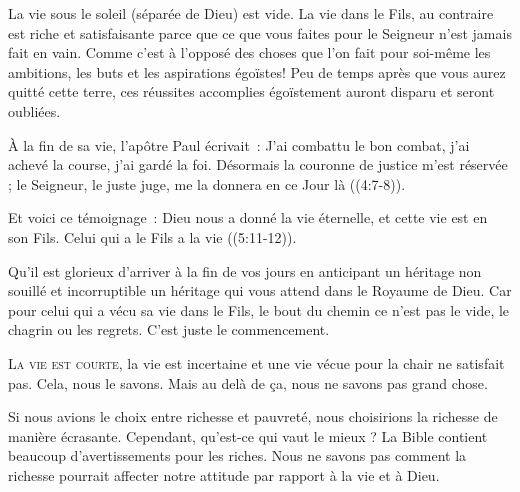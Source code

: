 La vie sous le soleil (séparée de Dieu) est vide.
 La vie dans le Fils, au contraire est riche et satisfaisante
 parce que ce que vous faites pour le Seigneur n'est jamais fait en vain.
 Comme c'est à l'opposé des choses que l'on fait pour soi-même
 \ocadr les ambitions, les buts et les aspirations égoïstes!
 Peu de temps après que vous aurez quitté cette terre,
 ces réussites accomplies égoïstement auront disparu et seront oubliées. 


À la fin de sa vie, l'apôtre Paul écrivait~: 
 \og J'ai combattu le bon combat, j'ai achevé la course, j'ai gardé la foi.
 Désormais la couronne de justice m'est réservée ;
 le Seigneur, le juste juge, me la donnera en ce Jour là \fg{}
 ((4:7-8)). 

Et voici ce témoignage~:
 \og Dieu nous a donné la vie éternelle, et cette vie est en son Fils.
 Celui qui a le Fils a la vie \fg{} ((5:11-12)). 

Qu'il est glorieux d'arriver à la fin de vos jours en anticipant un héritage
 non souillé et incorruptible \ocadr un héritage qui vous attend
 dans le Royaume de Dieu.
 Car pour celui qui a vécu sa vie dans le Fils, le bout du chemin
 ce n'est pas le vide, le chagrin ou les regrets. C'est juste le commencement. 

\dvrule






\lettrine{L}{a vie est courte,} la vie est incertaine et une vie vécue
 pour la chair ne satisfait pas. Cela, nous le savons.
 Mais au delà de ça, nous ne savons pas grand chose. 

Si nous avions le choix entre richesse et pauvreté,
 nous choisirions la richesse de manière écrasante.
 Cependant, 
 qu'est-ce qui vaut le mieux ? 
 La Bible contient beaucoup d'avertissements pour les riches.
 Nous ne savons pas comment la richesse pourrait affecter
 notre attitude par rapport à la vie et à Dieu. 

